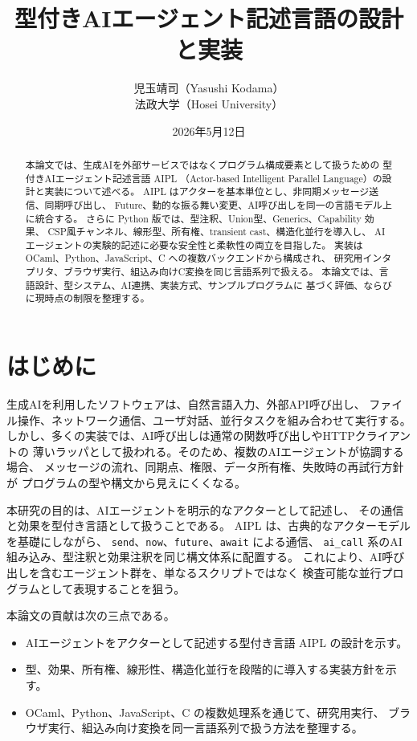 \documentclass[11pt,a4paper,uplatex,dvipdfmx]{jsarticle}
\title{型付きAIエージェント記述言語の設計と実装}
\author{児玉靖司（Yasushi Kodama）\\法政大学（Hosei University）}
\date{2026年5月12日}
\newcommand{\code}[1]{\texttt{#1}}
\begin{document}
\maketitle

\begin{abstract}
本論文では、生成AIを外部サービスではなくプログラム構成要素として扱うための
型付きAIエージェント記述言語 AIPL
（Actor-based Intelligent Parallel Language）の設計と実装について述べる。
AIPL はアクターを基本単位とし、非同期メッセージ送信、同期呼び出し、
Future、動的な振る舞い変更、AI呼び出しを同一の言語モデル上に統合する。
さらに Python 版では、型注釈、Union型、Generics、Capability 効果、
CSP風チャンネル、線形型、所有権、transient cast、構造化並行を導入し、
AIエージェントの実験的記述に必要な安全性と柔軟性の両立を目指した。
実装は OCaml、Python、JavaScript、C への複数バックエンドから構成され、
研究用インタプリタ、ブラウザ実行、組込み向けC変換を同じ言語系列で扱える。
本論文では、言語設計、型システム、AI連携、実装方式、サンプルプログラムに
基づく評価、ならびに現時点の制限を整理する。
\end{abstract}

\tableofcontents
\newpage

\section{はじめに}

生成AIを利用したソフトウェアは、自然言語入力、外部API呼び出し、
ファイル操作、ネットワーク通信、ユーザ対話、並行タスクを組み合わせて実行する。
しかし、多くの実装では、AI呼び出しは通常の関数呼び出しやHTTPクライアントの
薄いラッパとして扱われる。そのため、複数のAIエージェントが協調する場合、
メッセージの流れ、同期点、権限、データ所有権、失敗時の再試行方針が
プログラムの型や構文から見えにくくなる。

本研究の目的は、AIエージェントを明示的なアクターとして記述し、
その通信と効果を型付き言語として扱うことである。
AIPL は、古典的なアクターモデルを基礎にしながら、
\code{send}、\code{now}、\code{future}、\code{await} による通信、
\code{ai\_call} 系のAI組み込み、型注釈と効果注釈を同じ構文体系に配置する。
これにより、AI呼び出しを含むエージェント群を、単なるスクリプトではなく
検査可能な並行プログラムとして表現することを狙う。

本論文の貢献は次の三点である。

\begin{itemize}
  \item AIエージェントをアクターとして記述する型付き言語 AIPL の設計を示す。
  \item 型、効果、所有権、線形性、構造化並行を段階的に導入する実装方針を示す。
  \item OCaml、Python、JavaScript、C の複数処理系を通じて、研究用実行、
        ブラウザ実行、組込み向け変換を同一言語系列で扱う方法を整理する。
\end{itemize}
\end{document}
